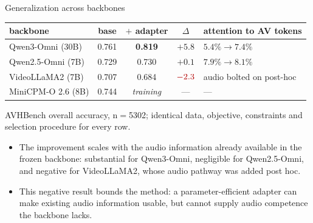 \documentclass[aspectratio=169,11pt]{beamer}
\begin{document}
\begin{frame}{Generalization across backbones}
\centering
\renewcommand{\arraystretch}{1.2}
\footnotesize
\begin{tabular}{l cc c l}
\toprule
backbone & base & $+$ adapter & $\Delta$ & attention to AV tokens \\
\midrule
Qwen3-Omni (30B)  & 0.761 & \textbf{0.819} & $+5.8$ & $5.4\% \to 7.4\%$ \\
Qwen2.5-Omni (7B) & 0.729 & 0.730 & $+0.1$ & $7.9\% \to 8.1\%$ \\
VideoLLaMA2 (7B)  & 0.707 & 0.684 & $\textcolor{red!70!black}{-2.3}$ & audio bolted on post-hoc \\
MiniCPM-O 2.6 (8B) & 0.744 & \emph{training} & --- & --- \\
\bottomrule
\end{tabular}
\par\vspace{0.4em}
{\scriptsize AVHBench overall accuracy, n$=$5302; identical data, objective, constraints and
selection procedure for every row.}
\vfill
\begin{itemize}\footnotesize
\item The improvement scales with the audio information already available in the frozen backbone:
substantial for Qwen3-Omni, negligible for Qwen2.5-Omni, and negative for VideoLLaMA2, whose audio
pathway was added post hoc.
\item This negative result bounds the method: a parameter-efficient adapter can make existing audio
information usable, but cannot supply audio competence the backbone lacks.
\end{itemize}
\end{frame}
\end{document}
